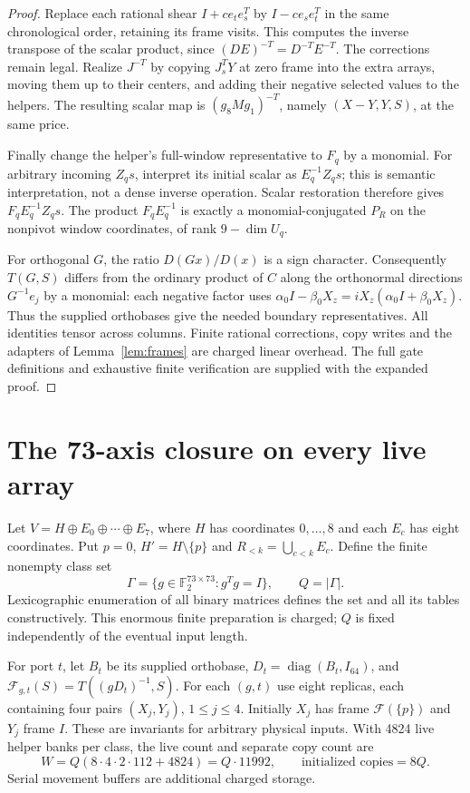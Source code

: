 \documentclass[11pt]{amsart}
\theoremstyle{remark}
\newcommand{\F}{\mathbb F_2}
\newcommand{\diag}{\operatorname{diag}}
\begin{document}
\begin{proof}
Replace each rational shear $I+ce_te_s^T$ by $I-ce_se_t^T$ in the
same chronological order, retaining its frame visits. This computes
the inverse transpose of the scalar product, since
$(DE)^{-T}=D^{-T}E^{-T}$. The corrections remain legal. Realize
$J^{-T}$ by copying $J_s^TY$ at zero frame into the extra arrays,
moving them up to their centers, and adding their negative selected
values to the helpers. The resulting scalar map is
$(g_8Mg_1)^{-T}$, namely $(X-Y,Y,S)$, at the same price.

Finally change the helper's full-window representative to $F_q$ by a
monomial. For arbitrary incoming $Z_qs$, interpret its initial scalar
as $E_q^{-1}Z_qs$; this is semantic interpretation, not a dense inverse
operation. Scalar restoration therefore gives $F_qE_q^{-1}Z_qs$.
The product $F_qE_q^{-1}$ is exactly a monomial-conjugated $P_R$ on
the nonpivot window coordinates, of rank $9-\dim U_q$.

For orthogonal $G$, the ratio $D(Gx)/D(x)$ is a sign character.
Consequently $T(G,S)$ differs from the ordinary product of $C$ along
the orthonormal directions $G^{-1}e_j$ by a monomial: each negative
factor uses $\alpha_0I-\beta_0X_z=iX_z(\alpha_0I+\beta_0X_z)$.
Thus the supplied orthobases give the needed boundary representatives.
All identities tensor across columns. Finite rational corrections,
copy writes and the adapters of Lemma~\ref{lem:frames} are charged
linear overhead. The full gate definitions and exhaustive finite
verification are supplied with the expanded proof.
\end{proof}

\section{The 73-axis closure on every live array}
Let $V=H\oplus E_0\oplus\cdots\oplus E_7$, where $H$ has coordinates
$0,\ldots,8$ and each $E_c$ has eight coordinates. Put $p=0$,
$H'=H\setminus\{p\}$ and $R_{<k}=\bigcup_{c<k}E_c$.
Define the finite nonempty class set
\[
 \Gamma=\{g\in\F^{73\times73}:g^Tg=I\},\qquad Q=|\Gamma|.
\]
Lexicographic enumeration of all binary matrices defines the set and
all its tables constructively. This enormous finite preparation is
charged; $Q$ is fixed independently of the eventual input length.

For port $t$, let $B_t$ be its supplied orthobase, $D_t=\diag(B_t,I_{64})$,
and $\mathcal F_{g,t}(S)=T((gD_t)^{-1},S)$. For each $(g,t)$ use eight
replicas, each containing four pairs $(X_j,Y_j)$, $1\le j\le4$.
Initially $X_j$ has frame $\mathcal F(\{p\})$ and $Y_j$ frame $I$.
These are invariants for arbitrary physical inputs. With 4824 live
helper banks per class, the live count and separate copy count are
\begin{equation}\label{eq:stock}
 W=Q(8\cdot4\cdot2\cdot112+4824)=Q\cdot11992,
 \qquad\text{initialized copies}=8Q.
\end{equation}
Serial movement buffers are additional charged storage.
\end{document}
